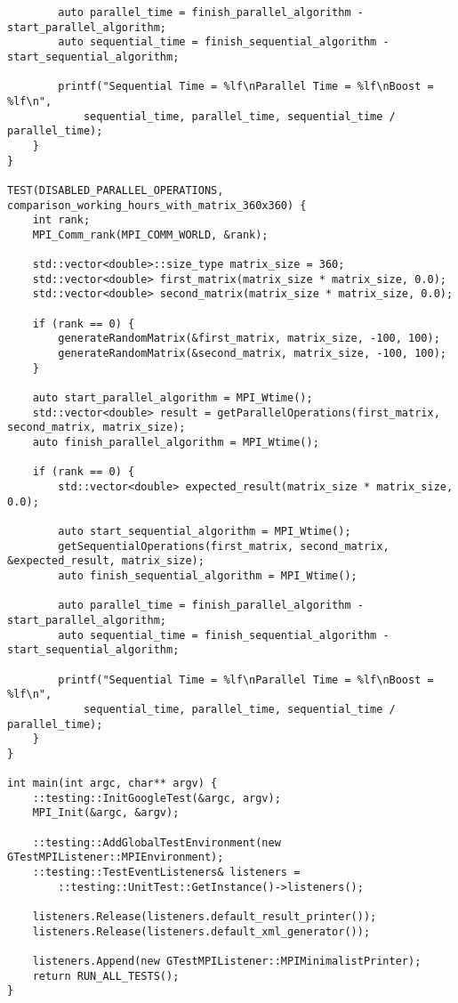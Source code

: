 \documentclass{report}
\begin{document}
\begin{lstlisting}
        auto parallel_time = finish_parallel_algorithm - start_parallel_algorithm;
        auto sequential_time = finish_sequential_algorithm - start_sequential_algorithm;

        printf("Sequential Time = %lf\nParallel Time = %lf\nBoost = %lf\n",
            sequential_time, parallel_time, sequential_time / parallel_time);
    }
}

TEST(DISABLED_PARALLEL_OPERATIONS, comparison_working_hours_with_matrix_360x360) {
    int rank;
    MPI_Comm_rank(MPI_COMM_WORLD, &rank);

    std::vector<double>::size_type matrix_size = 360;
    std::vector<double> first_matrix(matrix_size * matrix_size, 0.0);
    std::vector<double> second_matrix(matrix_size * matrix_size, 0.0);

    if (rank == 0) {
        generateRandomMatrix(&first_matrix, matrix_size, -100, 100);
        generateRandomMatrix(&second_matrix, matrix_size, -100, 100);
    }

    auto start_parallel_algorithm = MPI_Wtime();
    std::vector<double> result = getParallelOperations(first_matrix, second_matrix, matrix_size);
    auto finish_parallel_algorithm = MPI_Wtime();

    if (rank == 0) {
        std::vector<double> expected_result(matrix_size * matrix_size, 0.0);

        auto start_sequential_algorithm = MPI_Wtime();
        getSequentialOperations(first_matrix, second_matrix, &expected_result, matrix_size);
        auto finish_sequential_algorithm = MPI_Wtime();

        auto parallel_time = finish_parallel_algorithm - start_parallel_algorithm;
        auto sequential_time = finish_sequential_algorithm - start_sequential_algorithm;

        printf("Sequential Time = %lf\nParallel Time = %lf\nBoost = %lf\n",
            sequential_time, parallel_time, sequential_time / parallel_time);
    }
}

int main(int argc, char** argv) {
    ::testing::InitGoogleTest(&argc, argv);
    MPI_Init(&argc, &argv);

    ::testing::AddGlobalTestEnvironment(new GTestMPIListener::MPIEnvironment);
    ::testing::TestEventListeners& listeners =
        ::testing::UnitTest::GetInstance()->listeners();

    listeners.Release(listeners.default_result_printer());
    listeners.Release(listeners.default_xml_generator());

    listeners.Append(new GTestMPIListener::MPIMinimalistPrinter);
    return RUN_ALL_TESTS();
}

\end{lstlisting}
\end{document}
